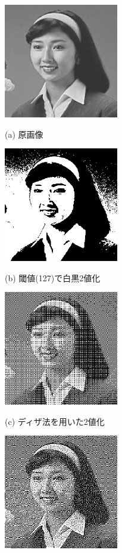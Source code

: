 \begin{figure}[H]
\begin{center}
\begin{minipage}{6cm}
\begin{center}
\includegraphics[width=5cm]{fig/hair1.eps}

(a) 原画像
\end{center}
\end{minipage}
\begin{minipage}{6cm}
\begin{center}
\includegraphics[width=5cm]{fig/hair1_bin.eps}

(b) 閾値(127)で白黒2値化
\end{center}
\end{minipage}
\begin{minipage}{6cm}
\begin{center}
\includegraphics[width=5cm]{fig/hair1_dither.eps}

(c) ディザ法を用いた2値化
\end{center}
\end{minipage}
\begin{minipage}{6cm}
\begin{center}
\includegraphics[width=5cm]{fig/hair1_ed.eps}


\end{center}
\end{minipage}
\end{center}
\end{figure}
